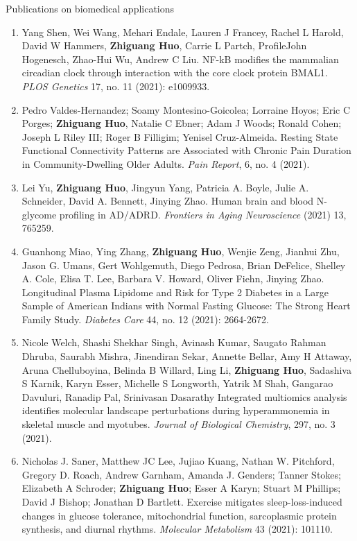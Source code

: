 \documentclass{resume} %
\begin{document}
\begin{rSection}{Publications on biomedical applications}
\begin{enumerate}[noitemsep,topsep=0pt, resume]
\item  
Yang Shen, Wei Wang, Mehari Endale, Lauren J Francey, Rachel L Harold, David W Hammers, {\bf Zhiguang Huo}, Carrie L Partch, ProfileJohn Hogenesch, Zhao-Hui Wu, Andrew C Liu.
NF-kB modifies the mammalian circadian clock through interaction with the core clock protein BMAL1.
\emph{PLOS Genetics} 17, no. 11 (2021): e1009933.


\item 
 Pedro Valdes-Hernandez; Soamy Montesino-Goicolea; Lorraine Hoyos; Eric C Porges; {\bf Zhiguang Huo}, Natalie C Ebner; Adam J Woods; Ronald Cohen; Joseph L Riley III; Roger B Filligim; Yenisel Cruz-Almeida. 
 Resting State Functional Connectivity Patterns are Associated with Chronic Pain Duration in Community-Dwelling Older Adults. 
\emph{Pain Report},  6, no. 4 (2021).


\item
Lei Yu, {\bf Zhiguang Huo}, Jingyun Yang, Patricia A. Boyle, Julie A. Schneider, David A. Bennett, Jinying Zhao.
Human brain and blood N-glycome profiling in AD/ADRD.
\emph{Frontiers in Aging Neuroscience} (2021) 13, 765259. 

\item
Guanhong Miao, Ying Zhang, {\bf Zhiguang Huo}, Wenjie Zeng, Jianhui Zhu, Jason G. Umans, Gert Wohlgemuth, Diego Pedrosa, Brian DeFelice, Shelley A. Cole, Elisa T. Lee, Barbara V. Howard, Oliver Fiehn, Jinying Zhao.
Longitudinal Plasma Lipidome and Risk for Type 2 Diabetes in a Large Sample of American Indians with Normal Fasting Glucose: The Strong Heart Family Study. 
\emph{Diabetes Care}  44, no. 12 (2021): 2664-2672.


\item
Nicole Welch, Shashi Shekhar Singh, Avinash Kumar, Saugato Rahman Dhruba, Saurabh Mishra, Jinendiran Sekar, Annette Bellar, Amy H Attaway, Aruna Chelluboyina, Belinda B Willard, Ling Li, {\bf Zhiguang Huo}, Sadashiva S Karnik, Karyn Esser, Michelle S Longworth, Yatrik M Shah, Gangarao Davuluri, Ranadip Pal, Srinivasan Dasarathy
Integrated multiomics analysis identifies molecular landscape perturbations during hyperammonemia in skeletal muscle and myotubes. 
\emph{Journal of Biological Chemistry}, 297, no. 3 (2021).


\item  
Nicholas J. Saner, Matthew JC Lee, Jujiao Kuang, Nathan W. Pitchford, Gregory D. Roach, Andrew Garnham, Amanda J. Genders; Tanner Stokes; Elizabeth A Schroder; {\bf Zhiguang Huo}; Esser A Karyn; Stuart M Phillips; David J Bishop; Jonathan D Bartlett.
Exercise mitigates sleep-loss-induced changes in glucose tolerance, mitochondrial function, sarcoplasmic protein synthesis, and diurnal rhythms.
\emph{Molecular Metabolism} 43 (2021): 101110.


\end{enumerate}
\end{rSection}
\end{document}
